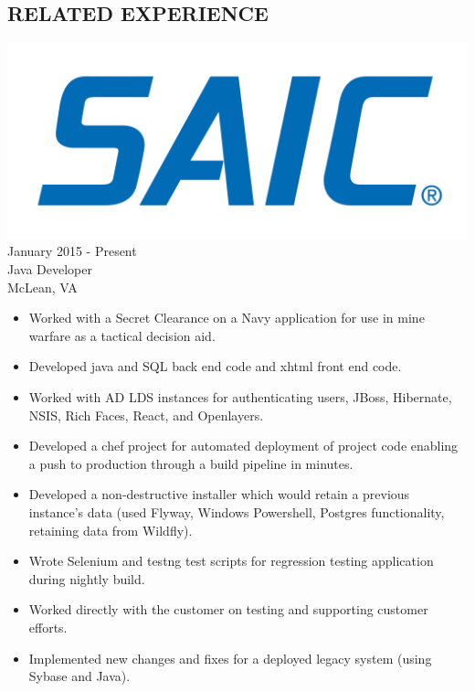 \documentclass[12pt, line, margin]{res}
\begin{document}
\begin{resume}
\section{RELATED EXPERIENCE} {\sl  \includegraphics[scale=0.015, trim=110 200 110 120]{resume_images/SAIC_logo_RGB-lg.jpg}} \hfill January 2015 - Present \\
                Java Developer \\
                McLean, VA
                 \begin{itemize}  \itemsep -2pt %
                 \item   Worked with a Secret Clearance on a Navy application for use in 
			mine warfare as a tactical decision aid.
	      \item   Developed java and SQL back end code and xhtml front end code.
	      \item   Worked with AD LDS instances for authenticating users, JBoss, \newline
			 Hibernate, NSIS, Rich Faces, React, and Openlayers.
	      \item   Developed a chef project for automated deployment of project \newline 
			code enabling a push to production through a build pipeline in  minutes.
	      \item   Developed a non-destructive installer which would retain a \newline
                         previous instance's data (used Flyway, Windows Powershell,\newline
                         Postgres functionality, retaining data from Wildfly). 
              \item   Wrote Selenium and testng test scripts for regression testing \newline
			 application during nightly build.
	      \item   Worked directly with the customer on testing and supporting \newline
			customer efforts.
	      \item   Implemented new changes and fixes for a deployed legacy system \newline
                        (using Sybase and Java).
                \end{itemize}
 

\end{resume}
\end{document}
